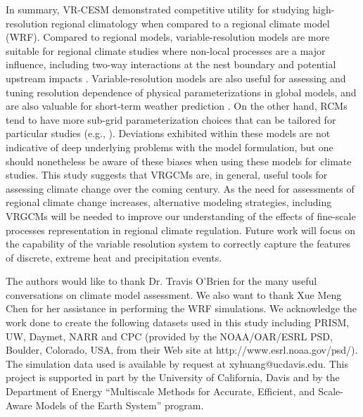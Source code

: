 \documentclass[draft,ms]{agutex}   %
\begin{document}
\begin{article}

In summary, VR-CESM demonstrated competitive utility for studying high-resolution regional climatology when compared to a regional climate model (WRF). Compared to regional models, variable-resolution models are more suitable for regional climate studies where non-local processes are a major influence, including two-way interactions at the nest boundary and potential upstream impacts \citep{sakaguchi2015exploring}.  Variable-resolution models are also useful for assessing and tuning resolution dependence of physical parameterizations in global models, and are also valuable for short-term weather prediction \citep{zarzycki2015experimental}. On the other hand, RCMs tend to have more sub-grid parameterization choices that can be tailored for particular studies (e.g., \citep{cassano2011performance}). Deviations exhibited within these models are not indicative of deep underlying problems with the model formulation, but one should nonetheless be aware of these biases when using these models for climate studies. This study suggests that VRGCMs are, in general, useful tools for assessing climate change over the coming century. As the need for assessments of regional climate change increases, alternative modeling strategies, including VRGCMs will be needed to improve our understanding of the effects of fine-scale processes representation in regional climate regulation. Future work will focus on the capability of the variable resolution system to correctly capture the features of discrete, extreme heat and precipitation events.



\begin{acknowledgments}


The authors would like to thank Dr. Travis O'Brien for the many useful conversations on climate model assessment. We also want to thank Xue Meng Chen for her assistance in performing the WRF simulations. We acknowledge the work done to create the following datasets used in this study including PRISM, UW, Daymet, NARR and CPC (provided by the NOAA/OAR/ESRL PSD, Boulder, Colorado, USA, from their Web site at http://www.esrl.noaa.gov/psd/). The simulation data used is available by request at xyhuang@ucdavis.edu. This project is supported in part by the University of California, Davis and by the Department of Energy ``Multiscale Methods for Accurate, Efficient, and Scale-Aware Models of the Earth System'' program. 
\end{acknowledgments}


\end{article}
\end{document}
